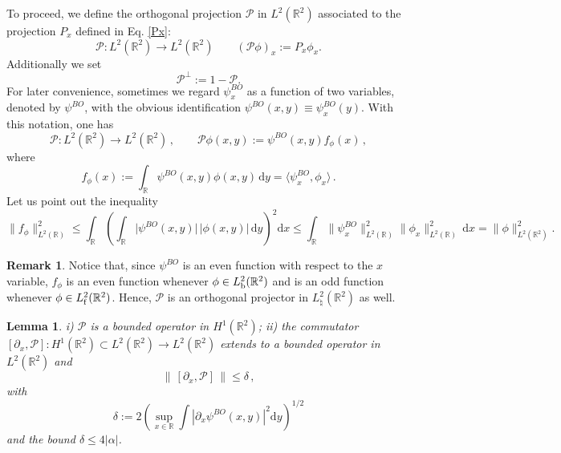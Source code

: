 \documentclass[a4paper,11pt,reqno]{amsart}
\newtheorem{lemma}[theorem]{Lemma}
\theoremstyle{definition}
\newtheorem{remark}[theorem]{Remark}
\numberwithin{equation}{section}
\newcommand{\RE}{\mathbb R}
\newcommand{\PP}{\mathcal P}
\renewcommand{\d}{\mathrm{d}}
\newcommand{\bos}{\text{\rm b}}
\newcommand{\fer}{\text{\rm f}}
\newcommand{\bosfer}{{\natural}}
\begin{document}
To proceed, we define the orthogonal projection $\mathcal{P}$ in $L^2(\RE^2)$ associated to the projection ${P}_x$ defined in Eq. \eqref{Px}:  
\begin{equation*}
 \mathcal{P} :L^2(\RE^2)\to  L^2(\RE^2) \qquad   \left(\mathcal{P} \phi\right)_x  := P_x \phi_x .
\end{equation*} 
Additionally we set
\[ 
\mathcal{P}^\perp  :=1 - \mathcal P. 
\]
For later convenience, sometimes we regard $\psi^{BO}_x$  as a function of two variables, denoted by  $\psi^{BO}$, with the obvious identification $\psi^{BO}(x,y)\equiv \psi^{BO}_x(y)$. With this notation, one has 
\begin{equation*}%
\mathcal{P}:L^{2}(\RE^{2})\to L^{2}(\RE^{2})\,,\qquad
\mathcal{P} \phi(x,y) := %
\psi^{BO}(x,y) f_\phi(x) \, ,
\end{equation*}
 where   
 \[
    f_\phi(x) := \int_{\RE} {\psi^{BO}(x,y)} \phi(x,y)\, \d y =\langle\psi_{x}^{BO},\phi_{x}\rangle  \,.
    \]
Let us point out the inequality
    \begin{equation*}%
\|  f_\phi\|^{2}_{L^2(\RE)} \leq \int_{\RE}\left(\int_{\RE} {|\psi^{BO}(x,y)}|\, |\phi(x,y)|\, \d y\right)^{\!2}\!\d x\le \int_{\RE}\|\psi^{BO}_{x}\|^{2}_{L^2(\RE)} \|\phi_{x}\|^{2}_{L^2(\RE)}\,\d x=\|\phi\|^{2}_{L^2(\RE^2)}. 
    \end{equation*}
\begin{remark}\label{remL2} Notice that, since $\psi^{BO}$ is an even function with respect to the $x$ variable, $f_{\phi}$ is an even function whenever $\phi\in L^{2}_{\bos}(\RE^{2})$ and is an odd function whenever $\phi\in L^{2}_{\fer}(\RE^{2})$. Hence, $\PP$ is an orthogonal projector in $L^{2}_{\bosfer}(\RE^{2})$ as well.
\end{remark}     
\begin{lemma}\label{l:PH}  i) $\mathcal P$ is a bounded operator in $H^1(\RE^2)$; 
ii) the commutator $[\partial_{x},\PP]:H^{1}(\RE^{2})\subset L^2(\RE^2)\to L^2(\RE^2)$ extends to a bounded operator in $L^{2}(\RE^{2})$ and 
\begin{equation*}%
\|\,[\partial_{x}, \PP]\,\| \leq \delta\, ,
\end{equation*}
with 
\begin{equation*}%
\delta := 2\left( \sup_{x\in\RE} \int |\partial_x \psi^{BO}(x,y)|^2 \d y \right)^{1/2}
\end{equation*}
and the bound $\delta \leq 4 |\alpha|$.
\end{lemma}
\end{document}
